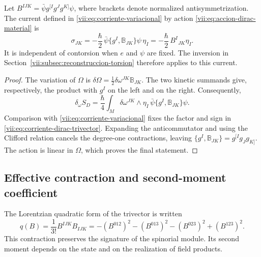 \begin{proposition}
\label{vii:prop:corriente-dirac-explicita}
Let
\(B^{IJK}=\bar\psi g^{[I}g^Jg^{K]}\psi\), where brackets
denote normalized antisymmetrization. The current defined in
\eqref{vii:eq:corriente-variacional} by action
\eqref{vii:eq:accion-dirac-material} is
\begin{equation}
 \sigma_{JK}
 =-\frac{\hbar}{2}\,
   \bar\psi\{g^I,\mathbb B_{JK}\}\psi\,\eta_I
 =-\frac{\hbar}{2}\,B^I{}_{JK}\eta_I.
 \label{vii:eq:corriente-dirac-trivector}
\end{equation}
It is independent of contorsion when \(e\) and \(\psi\) are
fixed. The inversion in Section~\ref{vii:subsec:reconstruccion-torsion}
therefore applies to this current.
\end{proposition}
\begin{proof}
The variation of \(\Omega\) is
\(\delta\Omega=\frac12\delta\omega^{JK}\mathbb B_{JK}\).
The two kinetic summands give, respectively, the product with
\(g^I\) on the left and on the right. Consequently,
\[
 \delta_\omega S_D
 =\frac{\hbar}{4}\int_M\delta\omega^{JK}\wedge\eta_I\,
                 \bar\psi\{g^I,\mathbb B_{JK}\}\psi.
\]
Comparison with \eqref{vii:eq:corriente-variacional} fixes the
factor and sign in \eqref{vii:eq:corriente-dirac-trivector}.
Expanding the anticommutator and using the Clifford relation
cancels the degree-one contractions, leaving
\(\{g^I,\mathbb B_{JK}\}=g^{[I}g_Jg_{K]}\).
The action is linear in \(\Omega\), which proves the final
statement.
\end{proof}

\subsection{Effective contraction and second-moment coefficient}
\label{vii:subsec:contraccion-espinorial}

The Lorentzian quadratic form of the trivector is written
\begin{equation}
 q(B)=\frac1{3!}B^{IJK}B_{IJK}
 =-(B^{012})^2-(B^{013})^2-(B^{023})^2+(B^{123})^2.
 \label{vii:eq:cuadratica-trivector}
\end{equation}
This contraction preserves the signature of the spinorial module. Its second
moment depends on the state and on the realization of field
products.

